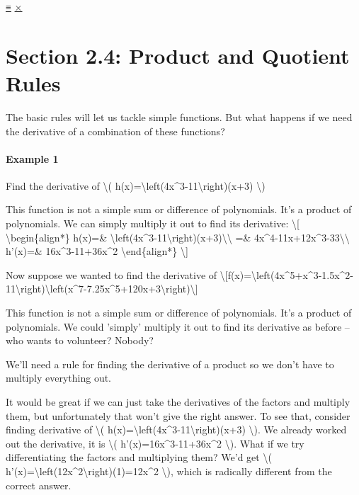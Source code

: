 \protect\hyperlink{main-nav}{≡} \protect\hyperlink{close-nav}{×}

\hypertarget{section-2.4-product-and-quotient-rules}{%
\section{Section 2.4: Product and Quotient
Rules}\label{section-2.4-product-and-quotient-rules}}

The basic rules will let us tackle simple functions. But what happens if
we need the derivative of a combination of these functions?

\hypertarget{example-1}{%
\paragraph{Example 1}\label{example-1}}

Find the derivative of \textbackslash{}(
h(x)=\textbackslash{}left(4x\^{}3-11\textbackslash{}right)(x+3)
\textbackslash{})

This function is not a simple sum or difference of polynomials. It's a
product of polynomials. We can simply multiply it out to find its
derivative: \textbackslash{}{[} \textbackslash{}begin\{align*\} h(x)=\&
\textbackslash{}left(4x\^{}3-11\textbackslash{}right)(x+3)\textbackslash{}\textbackslash{}
=\& 4x\^{}4-11x+12x\^{}3-33\textbackslash{}\textbackslash{} h'(x)=\&
16x\^{}3-11+36x\^{}2 \textbackslash{}end\{align*\} \textbackslash{}{]}

Now suppose we wanted to find the derivative of
\textbackslash{}{[}f(x)=\textbackslash{}left(4x\^{}5+x\^{}3-1.5x\^{}2-11\textbackslash{}right)\textbackslash{}left(x\^{}7-7.25x\^{}5+120x+3\textbackslash{}right)\textbackslash{}{]}

This function is not a simple sum or difference of polynomials. It's a
product of polynomials. We could 'simply' multiply it out to find its
derivative as before -- who wants to volunteer? Nobody?

We'll need a rule for finding the derivative of a product so we don't
have to multiply everything out.

It would be great if we can just take the derivatives of the factors and
multiply them, but unfortunately that won't give the right answer. To
see that, consider finding derivative of \textbackslash{}(
h(x)=\textbackslash{}left(4x\^{}3-11\textbackslash{}right)(x+3)
\textbackslash{}). We already worked out the derivative, it is
\textbackslash{}( h'(x)=16x\^{}3-11+36x\^{}2 \textbackslash{}). What if
we try differentiating the factors and multiplying them? We'd get
\textbackslash{}(
h'(x)=\textbackslash{}left(12x\^{}2\textbackslash{}right)(1)=12x\^{}2
\textbackslash{}), which is radically different from the correct answer.

